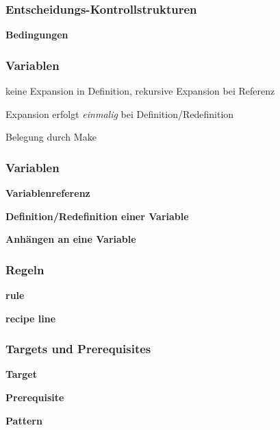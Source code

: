 \begin{frame}
	\frametitle{Entscheidungs-Kontrollstrukturen}
	

	\textbf{Bedingungen}
	
\end{frame}
%

\begin{frame}
\frametitle{Variablen}

	\begin{description}
		\pause
		\item[rekursiv expandierte Variablen] keine Expansion in Definition, rekursive Expansion bei Referenz
		\pause
		\item[einfach expandierte Variablen] Expansion erfolgt \emph{einmalig} bei Definition/Redefinition
		\pause
		\item[automatische Variablen] Belegung durch Make
	\end{description}
\end{frame}

\begin{frame}
\frametitle{Variablen}
	\textbf{Variablenreferenz}
	

	\textbf{Definition/Redefinition einer Variable}
	

	\textbf{Anhängen an eine Variable}
	

	\vfill\eject
\end{frame}

\begin{frame}
\frametitle{Regeln}
	\textbf{rule}
	

	\textbf{recipe line}
	
\end{frame}

\begin{frame}
\frametitle{Targets und Prerequisites}
	\textbf{Target}
	

	\textbf{Prerequisite}
	

	\textbf{Pattern}
	
\end{frame}
